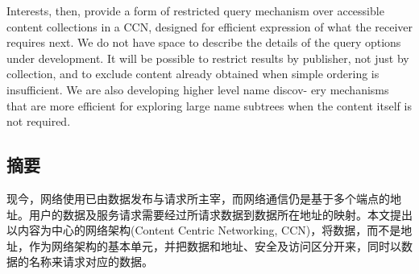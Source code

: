 \par
Interests, then, provide a form of restricted query mechanism over accessible content collections in a CCN, designed for efficient expression of what the receiver requires next. We do not have space to describe the details of the query options under development. It will be possible to restrict results by publisher, not just by collection, and to exclude content already obtained when simple ordering is insufficient. We are also developing higher level name discov- ery mechanisms that are more efficient for exploring large name subtrees when the content itself is not required.
\subsection{摘要}
\par
现今，网络使用已由数据发布与请求所主宰，而网络通信仍是基于多个端点的地址。用户的数据及服务请求需要经过所请求数据到数据所在地址的映射。本文提出以内容为中心的网络架构(Content Centric Networking, CCN)，将数据，而不是地址，作为网络架构的基本单元，并把数据和地址、安全及访问区分开来，同时以数据的名称来请求对应的数据。
\par
